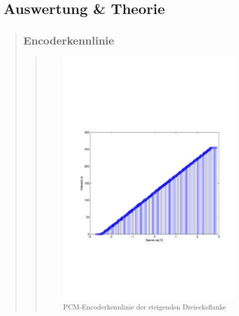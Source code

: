 \section{Auswertung \& Theorie}
\begin{quote}
    
    \subsection{Encoderkennlinie}
    
    \begin{quote}
        
    \begin{figure}[H]
        \centering
        \includegraphics[scale=0.7, trim = 2cm 7cm 1cm 8cm, clip]{Bilder/PCM_Test_auswertung}
        \caption{PCM-Encoderkennlinie der steigenden Dreiecksflanke}
        \label{fig:PCM_Test_dreieck}
    \end{figure}
    

\end{quote}
\end{quote}
